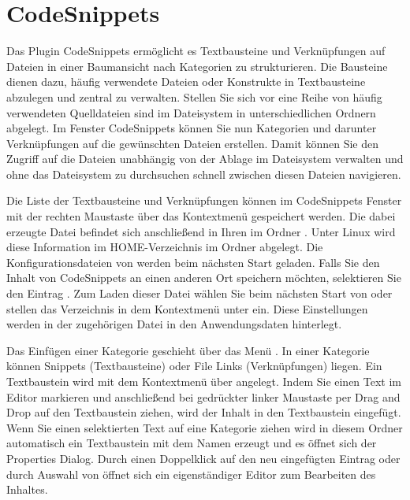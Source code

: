 \section{CodeSnippets}

Das Plugin CodeSnippets ermöglicht es Textbausteine und Verknüpfungen auf Dateien in einer Baumansicht nach Kategorien zu strukturieren. Die Bausteine dienen dazu, häufig verwendete Dateien oder Konstrukte in Textbausteine abzulegen und zentral zu verwalten. Stellen Sie sich vor eine Reihe von häufig verwendeten Quelldateien sind im Dateisystem in unterschiedlichen Ordnern abgelegt. Im Fenster CodeSnippets können Sie nun Kategorien und darunter Verknüpfungen auf die gewünschten Dateien erstellen. Damit können Sie den Zugriff auf die Dateien unabhängig von der Ablage im Dateisystem verwalten und ohne das Dateisystem zu durchsuchen schnell zwischen diesen Dateien navigieren.


Die Liste der Textbausteine und Verknüpfungen können im CodeSnippets Fenster mit der rechten Maustaste über das Kontextmenü  gespeichert werden. Die dabei erzeugte Datei  befindet sich anschließend in Ihren  im Ordner . Unter Linux wird diese Information im HOME-Verzeichnis im Ordner   abgelegt. Die Konfigurationsdateien von \codeblocks werden beim nächsten Start geladen. Falls Sie den Inhalt von CodeSnippets an einen anderen Ort speichern möchten, selektieren Sie den Eintrag . Zum Laden dieser Datei wählen Sie beim nächsten Start von \codeblocks {} oder stellen das Verzeichnis in dem Kontextmenü  unter  ein. Diese Einstellungen werden in der zugehörigen Datei  in den Anwendungsdaten hinterlegt.

Das Einfügen einer Kategorie geschieht über das Menü . In einer Kategorie können Snippets (Textbausteine) oder File Links (Verknüpfungen) liegen. Ein Textbaustein wird mit dem Kontextmenü über  angelegt. Indem Sie einen Text im \codeblocks Editor markieren und anschließend bei gedrückter linker Maustaste per Drag and Drop auf den Textbaustein ziehen, wird der Inhalt in den Textbaustein eingefügt. Wenn Sie einen selektierten Text auf eine Kategorie ziehen wird in diesem Ordner automatisch ein Textbaustein mit dem Namen  erzeugt und es öffnet sich der Properties Dialog. Durch einen Doppelklick auf den neu eingefügten Eintrag oder durch Auswahl von  öffnet sich ein eigenständiger Editor zum Bearbeiten des Inhaltes.

